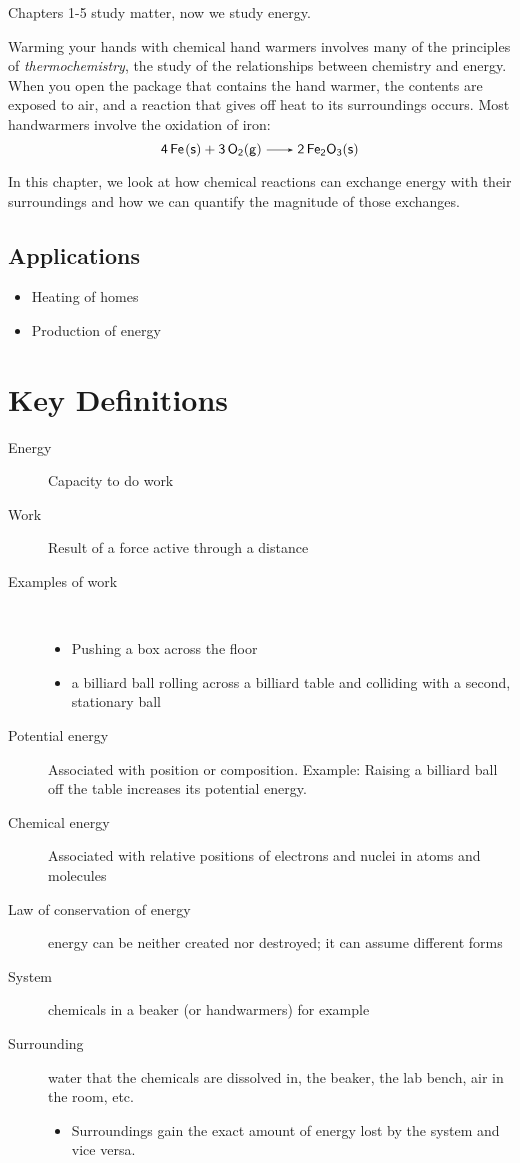 \documentclass[
	chapter=6,
	title={Thermochemistry},
	showanswers=true,
]{chem122notes}
\begin{document}
Chapters 1-5 study matter, now we study energy.

Warming your hands with chemical hand warmers involves many of the principles of \emph{thermochemistry}, the study of the relationships between chemistry and energy.
When you open the package that contains the hand warmer, the contents are exposed to air, and a reaction that gives off heat to its surroundings occurs.
Most handwarmers involve the oxidation of iron:
\[ \ce{4Fe(s) + 3O2(g) -> 2Fe2O3(s)} \]

In this chapter, we look at how chemical reactions can exchange energy with their surroundings and how we can quantify the magnitude of those exchanges.

\subsection{Applications}\label{subsec:applications}
\begin{itemize}
	\item Heating of homes
	\item Production of energy
\end{itemize}

\section{Key Definitions}\label{sec:key-definitions}
\begin{description}
	\item[Energy] Capacity to do work
	\item[Work] Result of a force active through a distance
	\item[Examples of work]~
	\begin{itemize}
		\item Pushing a box across the floor
		\item a billiard ball rolling across a billiard table and colliding with a second, stationary ball
	\end{itemize}
	\item[Potential energy] Associated with position or composition. Example: Raising a billiard ball off the table increases its potential energy.
	\item[Chemical energy] Associated with relative positions of electrons and nuclei in atoms and molecules
	\item[Law of conservation of energy] energy can be neither created nor destroyed; it can assume different forms
	\item[System] chemicals in a beaker (or handwarmers) for example
	\item[Surrounding] water that the chemicals are dissolved in, the beaker, the lab bench, air in the room, etc.
	\begin{itemize}
		\item Surroundings gain the exact amount of energy lost by the system and vice versa.
	\end{itemize}
\end{description}
\end{document}
